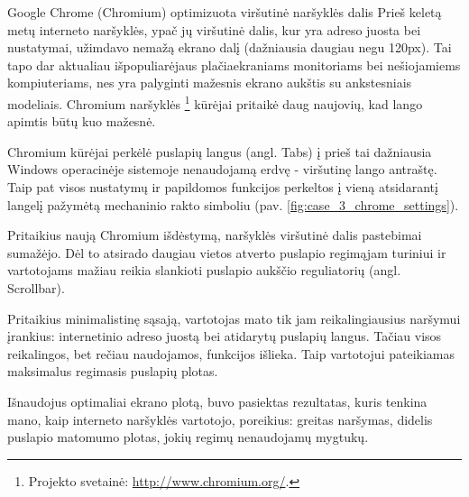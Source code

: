 \begin{xcase}{Google Chrome (Chromium) optimizuota viršutinė naršyklės dalis}
  \xcgoal
  {
  	Prieš keletą metų interneto naršyklės, ypač jų viršutinė dalis, kur yra adreso
	juosta bei nustatymai, užimdavo nemažą ekrano dalį (dažniausia daugiau negu 120px).
	Tai tapo dar aktualiau išpopuliarėjaus 
	plačiaekraniams monitoriams bei nešiojamiems kompiuteriams, nes yra palyginti 
	mažesnis ekrano aukštis su ankstesniais modeliais. Chromium naršyklės
	\footnote{Projekto svetainė: \url{http://www.chromium.org/}.} kūrėjai pritaikė 
	daug naujovių, kad lango apimtis būtų kuo mažesnė.
  }
  
  \xctools
  {
    Chromium kūrėjai perkėlė puslapių langus (angl. Tabs) į prieš tai dažniausia 
	Windows operacinėje sistemoje nenaudojamą erdvę - viršutinę lango antraštę.
	Taip pat visos nustatymų ir papildomos funkcijos perkeltos į vieną atsidarantį
	langelį pažymėtą mechaninio rakto simboliu (pav. \ref{fig:case_3_chrome_settings}).
	
    {
    }
  }
  
  \xcresult
  {
  	Pritaikius naują Chromium išdėstymą, naršyklės viršutinė dalis pastebimai sumažėjo.
    Dėl to atsirado daugiau vietos atverto puslapio regimąjam turiniui ir vartotojams 
    mažiau reikia slankioti puslapio aukščio reguliatorių (angl. Scrollbar).
  }
  
  \xcprinciples
  {
    {
      Pritaikius minimalistinę sąsają, vartotojas mato tik jam reikalingiausius 
      naršymui įrankius: internetinio adreso juostą bei atidarytų puslapių
      langus. Tačiau visos reikalingos, bet rečiau naudojamos, funkcijos
      išlieka. Taip vartotojui pateikiamas maksimalus regimasis puslapių 
      plotas.
    }
  }
  
  \xcthoughts
  {
    Išnaudojus optimaliai ekrano plotą, buvo pasiektas rezultatas, kuris tenkina mano,
    kaip interneto naršyklės vartotojo, poreikius: greitas naršymas, didelis puslapio
    matomumo plotas, jokių regimų nenaudojamų mygtukų.
  }
\end{xcase}
